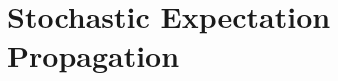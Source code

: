 \chapter{Stochastic Expectation Propagation}
\label{chap:factor_tying}

\ifpdf
    \graphicspath{{Chapter3/Figs/Raster/}{Chapter3/Figs/PDF/}{Chapter3/Figs/}}
\else
    \graphicspath{{Chapter3/Figs/Vector/}{Chapter3/Figs/}}
\fi



\label{sec:sep_all}

